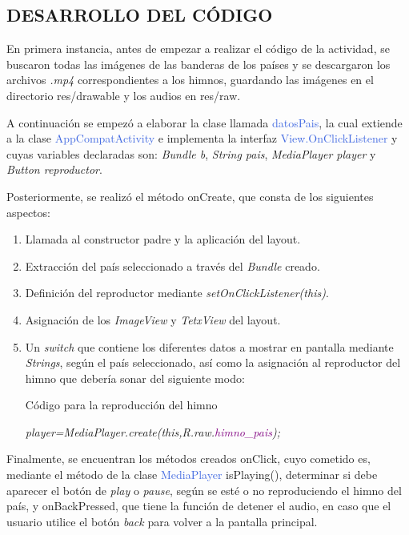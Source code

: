 \documentclass[letterpaper,twocolumn,openany,nodeprecatedcode,dvipsnames,nomultitoc]{dndbook}
\begin{document}
\begin{justify}
\subsection{DESARROLLO DEL CÓDIGO}
\vspace{5pt}
\par
En primera instancia, antes de empezar a realizar el código de la actividad, se buscaron todas las imágenes de las banderas de los países y se descargaron los archivos \textit{.mp4} correspondientes a los himnos, guardando las imágenes en el directorio res/drawable y los audios en res/raw.
\vspace{5pt}
\par
A continuación se empezó a elaborar la clase llamada \textcolor{RoyalBlue}{datosPais}, la cual extiende a la clase \textcolor{RoyalBlue}{AppCompatActivity} e implementa la interfaz \textcolor{RoyalBlue}{View.OnClickListener} y cuyas variables declaradas son: 
\textit{Bundle b}, \textit{String pais}, \textit{MediaPlayer player} y \textit{Button reproductor}.
\vspace{5pt}
\par
Posteriormente, se realizó el método \textcolor{BurntOrange}{onCreate}, que consta de los siguientes aspectos:
\begin{enumerate}
    \item Llamada al constructor padre y la aplicación del layout.
    \item Extracción del país seleccionado a través del \textit{Bundle} creado.
    \item Definición del reproductor mediante \textit{setOnClickListener(this)}.
    \item Asignación de los \textit{ImageView} y \textit{TetxView} del layout.
    \item Un \textit{switch} que contiene los diferentes datos a mostrar en pantalla mediante \textit{Strings}, según el país seleccionado, así como la asignación al reproductor del himno que debería sonar del siguiente modo:
    \begin{DndSidebar}{Código para la reproducción del himno}
    \centering
    \par 
    \textit{player=MediaPlayer.create(this,R.raw.\textcolor{purple}{himno\_pais});}
    \end{DndSidebar}
\end{enumerate}
\vspace{5pt}
\par
Finalmente, se encuentran los métodos creados \textcolor{BurntOrange}{onClick}, cuyo cometido es, mediante el método de la clase \textcolor{RoyalBlue}{MediaPlayer} \textcolor{BurntOrange}{isPlaying()}, determinar si debe aparecer el botón de \textit{play} o \textit{pause}, según se esté o no reproduciendo el himno del país, y \textcolor{BurntOrange}{onBackPressed}, que tiene la función de detener el audio, en caso que el usuario utilice el botón \textit{back} para volver a la pantalla principal.


\end{justify}
\end{document}

